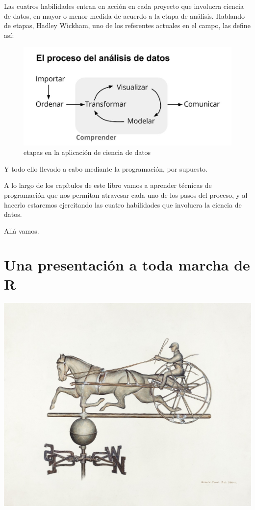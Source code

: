 \documentclass[
]{book}
\begin{document}
Las cuatros habilidades entran en acción en cada proyecto que involucra ciencia de datos, en mayor o menor medida de acuerdo a la etapa de análisis. Hablando de etapas, Hadley Wickham, uno de los referentes actuales en el campo, las define así:

\begin{figure}
\includegraphics[width=13.08in]{imagenes/proceso_ciencia_datos} \caption{etapas en la aplicación de ciencia de datos}\label{fig:unnamed-chunk-4}
\end{figure}

Y todo ello llevado a cabo mediante la programación, por supuesto.

A lo largo de los capítulos de este libro vamos a aprender técnicas de programación que nos permitan atravesar cada uno de los pasos del proceso, y al hacerlo estaremos ejercitando las cuatro habilidades que involucra la ciencia de datos.

Allá vamos.

\hypertarget{una-presentaciuxf3n-a-toda-marcha-de-r}{%
\chapter{Una presentación a toda marcha de R}\label{una-presentaciuxf3n-a-toda-marcha-de-r}}

\includegraphics[width=1\linewidth]{imagenes/a_toda_marcha}
\end{document}
